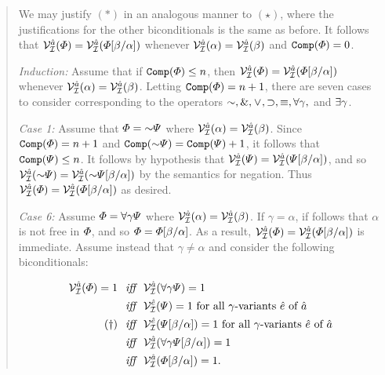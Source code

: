 \begin{quote}
  We may justify $(\ast)$ in an analogous manner to $(\star)$, where the justifications for the other biconditionals is the same as before. 
  It follows that $\mathcal{V}_{\mathcal{I}}^{\hat{a}}(\varPhi)=\mathcal{V}_{\mathcal{I}}^{\hat{a}}(\varPhi[\beta/\alpha])$ whenever $\mathcal{V}_{\mathcal{I}}^{\hat{a}}(\alpha)=\mathcal{V}_{\mathcal{I}}^{\hat{a}}(\beta)$ and $\texttt{Comp}(\varPhi)=0$. 

  \textit{Induction:} Assume that if $\texttt{Comp}(\varPhi)\leq n$, then $\mathcal{V}_{\mathcal{I}}^{\hat{a}}(\varPhi)=\mathcal{V}_{\mathcal{I}}^{\hat{a}}(\varPhi[\beta/\alpha])$ whenever $\mathcal{V}_{\mathcal{I}}^{\hat{a}}(\alpha)=\mathcal{V}_{\mathcal{I}}^{\hat{a}}(\beta)$. 
  Letting $\texttt{Comp}(\varPhi)=n+1$, there are seven cases to consider corresponding to the operators $\enot,\eand,\eor,\eif,\eiff,\qt{\forall}{\gamma},$ and $\exists \gamma$.

  \textit{Case 1:} Assume that $\metaA=\enot\metaB$ where $\mathcal{V}_{\mathcal{I}}^{\hat{a}}(\alpha)=\mathcal{V}_{\mathcal{I}}^{\hat{a}}(\beta)$.
  Since $\texttt{Comp}(\varPhi)=n+1$ and $\comp(\enot\metaB)=\comp(\metaB)+1$, it follows that $\texttt{Comp}(\varPsi)\leq n$.
  It follows by hypothesis that $\mathcal{V}_{\mathcal{I}}^{\hat{a}}(\varPsi)=\mathcal{V}_{\mathcal{I}}^{\hat{a}}(\varPsi[\beta/\alpha])$, and so $\VV{\I}{\va{a}}(\enot\metaB)=\VV{\I}{\va{a}}(\enot\metaB\unisub{\beta}{\alpha})$ by the semantics for negation.
  Thus $\mathcal{V}_{\mathcal{I}}^{\hat{a}}(\varPhi)=\mathcal{V}_{\mathcal{I}}^{\hat{a}}(\varPhi[\beta/\alpha])$ as desired. 

  \textit{Case 6:} Assume $\varPhi=\forall \gamma\varPsi$ where $\mathcal{V}_{\mathcal{I}}^{\hat{a}}(\alpha)=\mathcal{V}_{\mathcal{I}}^{\hat{a}}(\beta)$.
  If $\gamma=\alpha$, if follows that $\alpha$ is not free in $\varPhi$, and so $\varPhi=\varPhi[\beta/\alpha]$.
  As a result, $\mathcal{V}_{\mathcal{I}}^{\hat{a}}(\varPhi)=\mathcal{V}_{\mathcal{I}}^{\hat{a}}(\varPhi[\beta/\alpha])$ is immediate.
  Assume instead that $\gamma\neq\alpha$ and consider the following biconditionals:

  \vspace{-.2in}
  \begin{align*}
    \mathcal{V}_{\mathcal{I}}^{\hat{a}}(\varPhi)=1 &\textit{ ~iff~ } \mathcal{V}_{\mathcal{I}}^{\hat{a}}(\forall \gamma\varPsi)=1\\
      &\textit{ ~iff~ } \mathcal{V}_{\mathcal{I}}^{\hat{e}}(\varPsi)=1 \text{ for all } \gamma\text{-variants } \hat{e} \text{ of } \hat{a}\\ 
      (\dagger) &\textit{ ~iff~ } \mathcal{V}_{\mathcal{I}}^{\hat{e}}(\varPsi[\beta/\alpha])=1 \text{ for all } \gamma\text{-variants } \hat{e} \text{ of } \hat{a}\\  
      &\textit{ ~iff~ } \mathcal{V}_{\mathcal{I}}^{\hat{a}}(\forall \gamma\varPsi[\beta/\alpha])=1\\ 
      &\textit{ ~iff~ } \mathcal{V}_{\mathcal{I}}^{\hat{a}}(\varPhi[\beta/\alpha])=1.
  \end{align*}


\end{quote}

